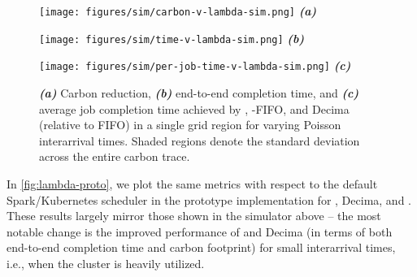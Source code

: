 \begin{figure*}[h]
\begin{minipage}{0.32\linewidth}
        \centering
    \texttt{[image: figures/sim/carbon-v-lambda-sim.png]} \vspace{-1em}
    {\centering \textbf{\textit{(a)}}}
\end{minipage} \hfill
\begin{minipage}{0.32\linewidth}
        \centering
    \texttt{[image: figures/sim/time-v-lambda-sim.png]} \vspace{-1em}
    {\centering \textbf{\textit{(b)}}}
\end{minipage}\hfill
\begin{minipage}{0.32\linewidth}
        \centering
    \texttt{[image: figures/sim/per-job-time-v-lambda-sim.png]} \vspace{-1em}
    {\centering \textbf{\textit{(c)}}}
\end{minipage}
\caption{ \textbf{\textit{(a)}} Carbon reduction, \textbf{\textit{(b)}} end-to-end completion time, and \textbf{\textit{(c)}} average job completion time achieved by \DANISH, \CAP-FIFO, and Decima (relative to FIFO) in a single grid region for varying Poisson interarrival times.  Shaded regions denote the standard deviation across the entire carbon trace. } \label{fig:lambda-sim}
\end{figure*}

In \autoref{fig:lambda-proto}, we plot the same metrics with respect to the default Spark/Kubernetes scheduler in the prototype implementation for \DANISH, Decima, and \CAP.  These results largely mirror those shown in the simulator above -- the most notable change is the improved performance of \DANISH and Decima (in terms of both end-to-end completion time and carbon footprint) for small interarrival times, i.e., when the cluster is heavily utilized.


